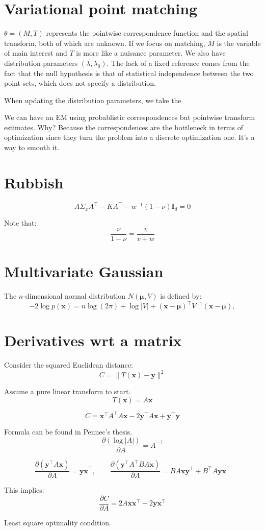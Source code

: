 \documentclass{article}
\def\x{{\mathbf{x}}}
\def\y{{\mathbf{y}}}
\def\I{{\mathbf{I}}}
\def\m{{\boldsymbol{\mu}}}
\begin{document}
\section{Variational point matching}

$\theta=(M,T)$ represents the pointwise correspondence function and the spatial transform, both of which are unknown. If we focus on matching, $M$ is the variable of main interest and $T$ is more like a nuisance parameter. We also have distribution parameters $(\lambda,\lambda_0)$. The lack of a fixed reference comes from the fact that the null hypothesis is that of statistical independence between the two point sets, which does not specify a distribution.

When updating the distribution parameters, we take the 


We can have an EM using probablistic correspondences but pointwise transform estimates. Why? Because the correspondences are the bottleneck in terms of optimization since they turn the problem into a discrete optimization one. It's a way to smooth it.





\section{Rubbish}


$$
A \Sigma_x A^{\top} - K A^{\top} -w^{-1} (1-\nu) \I_d  = 0
$$


Note that:
$$
\frac{\nu}{1-\nu}
=
\frac{v}{v+w}
$$




\appendix

\section{Multivariate Gaussian}

The $n$-dimensional normal distribution $N(\m,V)$ is defined by:
$$
-2\log p(\x)
= 
n\log(2\pi)
+\log |V|
+ (\x-\m)^\top V^{-1} (\x-\m),
$$

\section{Derivatives wrt a matrix}

Consider the squared Euclidean distance: 
$$
C = \| T(\x) - \y \|^2
$$

Assume a pure linear transform to start.
$$
T(\x) = A\x
$$

$$
C = 
\x^\top A^\top A \x - 2 \y^\top A \x
+ \y^\top \y 
$$

Formula can be found in Pennec's thesis.
$$
\frac{\partial (\log |A|)}{\partial A}
= A^{-\top}
$$

$$
\frac{\partial (\y^\top A \x)}{\partial A}
= \y \x^\top,
\qquad
\frac{\partial (\y^\top A^\top B A \x)}{\partial A}
= B A \x \y^\top + B^\top A \y \x^\top
$$


This implies:
$$
\frac{\partial C}{\partial A}
=
2 A \x \x^\top - 2 \y \x^\top
$$

Least square optimality condition.
\end{document}
